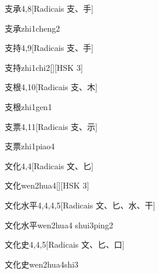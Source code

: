 \begin{entry}{支承}{4,8}[Radicais ⽀、⼿]
  \begin{phonetics}{支承}{zhi1cheng2}
  \end{phonetics}
\end{entry}

\begin{entry}{支持}{4,9}[Radicais ⽀、⼿]
  \begin{phonetics}{支持}{zhi1chi2}[][HSK 3]
  \end{phonetics}
\end{entry}

\begin{entry}{支根}{4,10}[Radicais ⽀、⽊]
  \begin{phonetics}{支根}{zhi1gen1}
  \end{phonetics}
\end{entry}

\begin{entry}{支票}{4,11}[Radicais ⽀、⽰]
  \begin{phonetics}{支票}{zhi1piao4}
  \end{phonetics}
\end{entry}

\begin{entry}{文化}{4,4}[Radicais ⽂、⼔]
  \begin{phonetics}{文化}{wen2hua4}[][HSK 3]
  \end{phonetics}
\end{entry}

\begin{entry}{文化水平}{4,4,4,5}[Radicais ⽂、⼔、⽔、⼲]
  \begin{phonetics}{文化水平}{wen2hua4 shui3ping2}
  \end{phonetics}
\end{entry}

\begin{entry}{文化史}{4,4,5}[Radicais ⽂、⼔、⼝]
  \begin{phonetics}{文化史}{wen2hua4shi3}
  \end{phonetics}
\end{entry}

